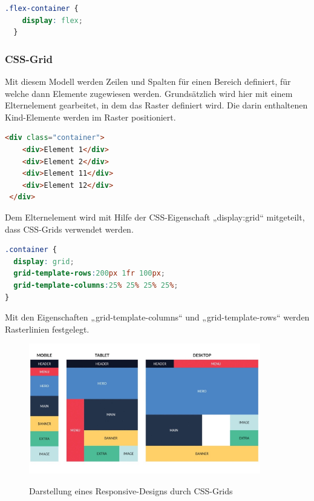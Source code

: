 \begin{lstlisting}[language=CSS, caption=CSS-Code zur Aktivierung der Flexbox, label=lst:impl:flexCSS]
  .flex-container {
    display: flex;
  }
\end{lstlisting} \cite{flexbox}

\subsubsection{CSS-Grid}

Mit diesem Modell werden Zeilen und Spalten für einen Bereich definiert, für welche dann Elemente zugewiesen werden. Grundsätzlich wird hier mit einem Elternelement gearbeitet, in dem das Raster definiert wird. Die darin enthaltenen Kind-Elemente werden im Raster positioniert. 
\cite{cssgrid}

\newpage

\begin{lstlisting}[language=HTML, caption=HTML-Code vom Aufbau eines Grids, label=lst:impl:gridHTML]
  <div class="container"> 
    <div>Element 1</div> 
    <div>Element 2</div> 
    <div>Element 11</div> 
    <div>Element 12</div> 
 </div>
\end{lstlisting} \cite{cssgrid}

Dem Elternelement wird mit Hilfe der CSS-Eigenschaft „display:grid“ mitgeteilt, dass CSS-Grids verwendet werden. 

\begin{lstlisting}[language=CSS, caption=CSS-Code zur Aktivierung des Grids, label=lst:impl:gridCSS]
.container { 
  display: grid; 
  grid-template-rows:200px 1fr 100px; 
  grid-template-columns:25% 25% 25% 25%; 
}
\end{lstlisting} \cite{cssgrid}

Mit den Eigenschaften „grid-template-columns“ und „grid-template-rows“ werden Rasterlinien festgelegt.
\cite{cssgrid}

\begin{figure}[H]
  \centering
  \includegraphics[width=0.9\textwidth]{pics/cssGridDarstellung.jpg}
  \caption{Darstellung eines Responsive-Designs durch CSS-Grids}
  \cite{cssgridDarstellung}
\end{figure}

